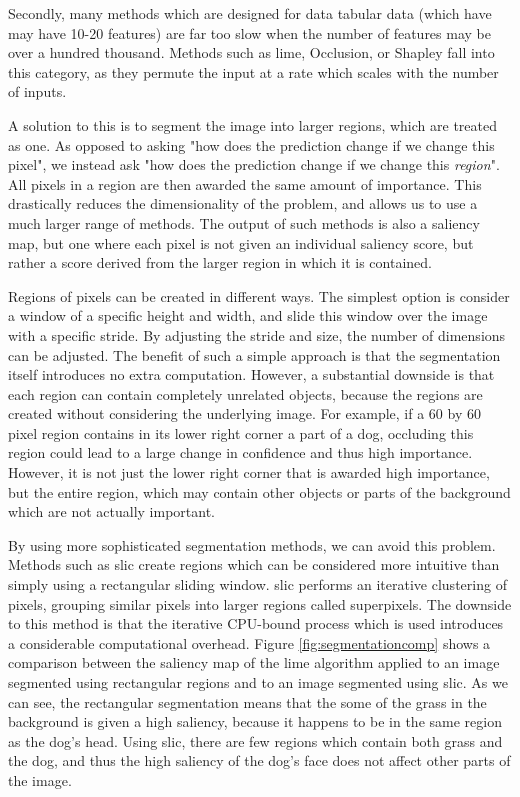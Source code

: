 \documentclass[UKenglish]{uiomasterthesis} %
\theoremstyle{definition}
\begin{document}
Secondly, many methods which are designed for data tabular data (which have may have 10-20 features) are far too slow when the number of features may be over a hundred thousand. Methods such as \ac{lime}, Occlusion, or Shapley fall into this category, as they permute the input at a rate which scales with the number of inputs.

A solution to this is to segment the image into larger regions, which are treated as one. As opposed to asking "how does the prediction change if we change this pixel", we instead ask "how does the prediction change if we change this {\it region}". All pixels in a region are then awarded the same amount of importance. This drastically reduces the dimensionality of the problem, and allows us to use a much larger range of methods. The output of such methods is also a saliency map, but one where each pixel is not given an individual saliency score, but rather a score derived from the larger region in which it is contained.

Regions of pixels can be created in different ways. The simplest option is consider a window of a specific height and width, and slide this window over the image with a specific stride. By adjusting the stride and size, the number of dimensions can be adjusted. The benefit of such a simple approach is that the segmentation itself introduces no extra computation. However, a substantial downside is that each region can contain completely unrelated objects, because the regions are created without considering the underlying image. For example, if a 60 by 60 pixel region contains in its lower right corner a part of a dog, occluding this region could lead to a large change in confidence and thus high importance. However, it is not just the lower right corner that is awarded high importance, but the entire region, which may contain other objects or parts of the background which are not actually important.

By using more sophisticated segmentation methods, we can avoid this problem. Methods such as \ac{slic} \cite{slic} create regions which can be considered more intuitive than simply using a rectangular sliding window. \ac{slic} performs an iterative clustering of pixels, grouping similar pixels into larger regions called superpixels. The downside to this method is that the iterative CPU-bound process which is used introduces a considerable computational overhead. Figure \ref{fig:segmentationcomp} shows a comparison between the saliency map of the \ac{lime} algorithm applied to an image segmented using rectangular regions and to an image segmented using \ac{slic}. As we can see, the rectangular segmentation means that the some of the grass in the background is given a high saliency, because it happens to be in the same region as the dog's head. Using \ac{slic}, there are few regions which contain both grass and the dog, and thus the high saliency of the dog's face does not affect other parts of the image.
\end{document}

